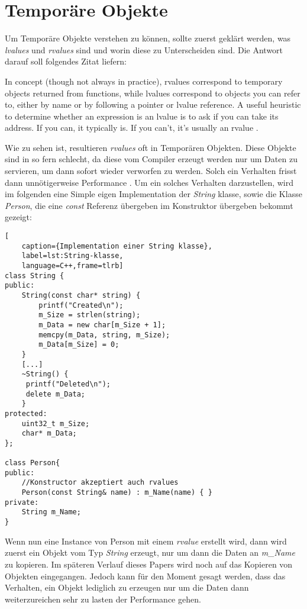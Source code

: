 \section{Temporäre Objekte}
Um Temporäre Objekte verstehen zu können, sollte zuerst geklärt werden, was \emph{lvalues} und
\emph{rvalues} sind und worin diese zu Unterscheiden sind. Die Antwort darauf soll folgendes
Zitat liefern:
\begin{zitat}
	In concept (though not always in practice), rvalues correspond to temporary
	objects returned from functions, while lvalues correspond to objects you can refer to, either by
	name or by following a pointer or lvalue reference. A useful heuristic to determine whether an
	expression is an lvalue is to ask if you can take its address. If you can, it typically is. If
	you can’t, it’s usually an rvalue \cite{EffectiveC++}.
\end{zitat}
Wie zu sehen ist, resultieren \emph{rvalues} oft in Temporären Objekten. Diese Objekte sind in so
fern schlecht, da diese vom Compiler erzeugt werden nur um Daten zu servieren, um dann sofort
wieder verworfen zu werden. Solch ein Verhalten frisst dann unnötigerweise Performance
.\cite{HandsOn}
\newline
\newline
Um ein solches Verhalten darzustellen, wird im folgenden eine Simple eigen Implementation der
\emph{String} klasse, sowie die Klasse \emph{Person}, die eine \emph{const} Referenz übergeben im
Konstruktor übergeben bekommt gezeigt:

\begin{lstlisting}[
    caption={Implementation einer String klasse},
    label=lst:String-klasse,
    language=C++,frame=tlrb]
class String {
public:
	String(const char* string) {
		printf("Created\n");
		m_Size = strlen(string);
		m_Data = new char[m_Size + 1];
		memcpy(m_Data, string, m_Size);
		m_Data[m_Size] = 0;
	}
	[...]
	~String() {
     printf("Deleted\n");
     delete m_Data;
    }
protected:
    uint32_t m_Size;
    char* m_Data;
};

class Person{
public:
	//Konstructor akzeptiert auch rvalues
	Person(const String& name) : m_Name(name) { }
private:
	String m_Name;
}
\end{lstlisting}

Wenn nun eine Instance von Person mit einem \emph{rvalue} erstellt wird, dann wird zuerst ein
Objekt vom Typ \emph{String} erzeugt, nur um dann die Daten an \emph{m\_Name} zu kopieren. Im
späteren Verlauf dieses Papers wird noch auf das Kopieren von Objekten eingegangen. Jedoch kann
für den Moment gesagt werden, dass das Verhalten, ein Objekt lediglich zu erzeugen nur um die
Daten dann weiterzureichen sehr zu lasten der Performance gehen.
